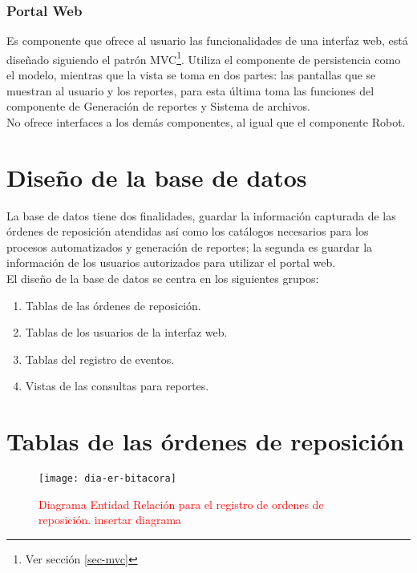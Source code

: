 \subsubsection{Portal Web}
Es componente que ofrece al usuario las funcionalidades de una interfaz web, está diseñado siguiendo el patrón MVC\footnote{Ver sección \ref{sec-mvc}}. Utiliza el componente de persistencia como el modelo, mientras que la vista se toma en dos partes: las pantallas que se muestran al usuario y los reportes, para esta última toma las funciones del componente de Generación de reportes y Sistema de archivos.\\
No ofrece interfaces a los demás componentes, al igual que el componente Robot. 



\section{Diseño de la base de datos}
La base de datos tiene dos finalidades, guardar la información capturada de las órdenes de reposición atendidas así como los catálogos necesarios para los procesos automatizados y generación de reportes; la segunda es guardar la información de los usuarios autorizados para utilizar el portal web.\\
El diseño de la base de datos se centra en los siguientes grupos:
\begin{enumerate}
	\item Tablas de las órdenes de reposición.
	\item Tablas de los usuarios de la interfaz web.
	\item Tablas del registro de eventos.
	\item Vistas de las consultas para reportes.
\end{enumerate}

\section{Tablas de las órdenes de reposición}
\begin{figure}[h]
  \centering
  \texttt{[image: dia-er-bitacora]} 
  \caption{\textcolor{red}{Diagrama Entidad Relación para el registro de ordenes de reposición. \newline insertar diagrama}}
  \label{fig:dia-er-bitacora}
\end{figure}


